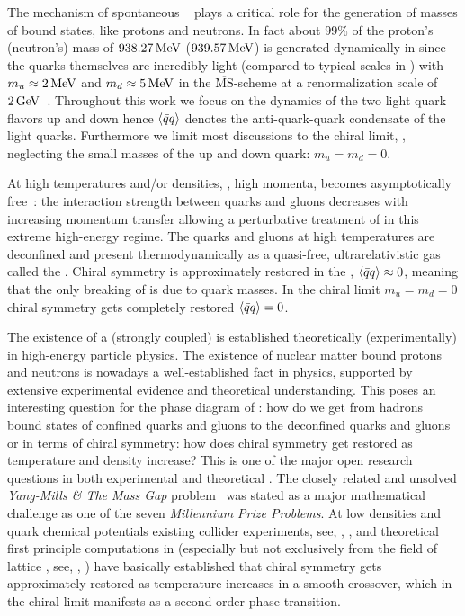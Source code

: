 The mechanism of spontaneous \csb{}~\cite{Nambu:1961tp,Nambu:1961fr} plays a critical role for the generation of masses of \qcd{} bound states, like protons and neutrons.
In fact about $99\%$ of the proton's (neutron's) mass of $938.27\,\mathrm{MeV}$ ($939.57\,\mathrm{MeV}$) is generated dynamically in \qcd{} since the quarks themselves are incredibly light (compared to typical scales in \qcd{}) with $m_u\approx2\,\mathrm{MeV}$ and $m_d\approx 5\,\mathrm{MeV}$ in the ${\overline{\mathrm{MS}}}$-scheme at a renormalization scale of $2\,\mathrm{GeV}$~\cite{ParticleDataGroup2022Aug}.
Throughout this work we focus on the dynamics of the two light quark flavors \dash{} up and down \dash{} hence $\langle \bar{q} q \rangle$ denotes the anti-quark-quark condensate of the light quarks.
Furthermore we limit most discussions to the chiral limit, \ie{}, neglecting the small masses of the up and down quark: $m_u=m_d=0$.

At high temperatures and/or densities, \ie{}, high momenta, \qcd{} becomes asymptotically free~\cite{Gross:1973id,Politzer:1973fx,Coleman1973Sep}: the interaction strength between quarks and gluons decreases with increasing momentum transfer allowing a perturbative treatment of \qcd{} in this extreme high-energy regime. 
The quarks and gluons at high temperatures are deconfined and present thermodynamically as a quasi-free, ultrarelativistic gas called the \qgp{}.
Chiral symmetry is approximately restored in the \qgp{}, $\langle \bar{q} q \rangle\approx 0$, meaning that the only breaking of \csb{} is due to quark masses.
In the chiral limit $m_u=m_d=0$ chiral symmetry gets completely restored $\langle \bar{q} q \rangle=0$.

The existence of a (strongly coupled) \qgp{} is established theoretically (experimentally) in high-energy particle physics.
The existence of nuclear matter \dash{} bound protons and neutrons \dash{} is nowadays a well-established fact in physics, supported by extensive experimental evidence and theoretical understanding.
This poses an interesting question for the phase diagram of \qcd{}: how do we get from hadrons \dash{} bound states of confined quarks and gluons \dash{} to the \qgp{} \dash{} deconfined quarks and gluons \dash{} 
or in terms of chiral symmetry: how does chiral symmetry get restored as temperature and density increase?
This is one of the major open research questions in both experimental and theoretical \hep{}.
The closely related and unsolved \textit{Yang-Mills \& The Mass Gap} problem~\cite{YMMilleniumProblem} was stated as a major mathematical challenge as one of the seven \textit{Millennium Prize Problems}.\label{YMmillennium}
At low densities and quark chemical potentials existing collider experiments, see, \eg{}, \ccite{\qcdExpFreezeout}, and theoretical first principle computations in \qcd{} (especially but not exclusively from the field of lattice \qcd{}, see, \eg{}, ) have basically established that chiral symmetry gets approximately restored as temperature increases in a smooth crossover, which in the chiral limit manifests as a second-order phase transition.

